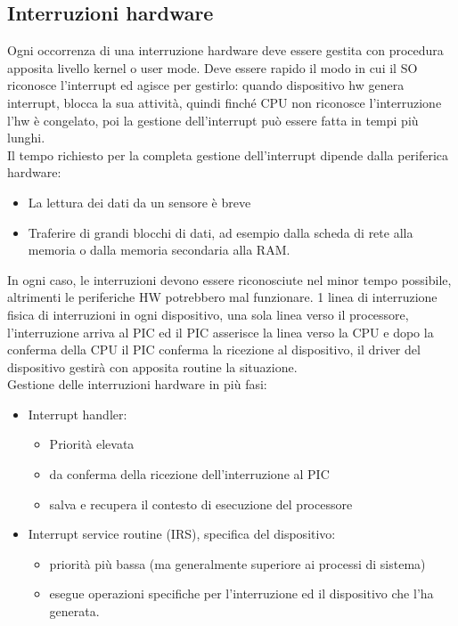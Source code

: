 \documentclass[12pt, oneside]{extbook}
\begin{document}
\subsection{Interruzioni hardware}
Ogni occorrenza di una interruzione hardware deve essere gestita con procedura apposita livello kernel o user mode. Deve essere rapido il modo in cui il SO riconosce l'interrupt ed agisce per gestirlo: quando dispositivo hw genera interrupt, blocca la sua attività, quindi finché CPU non riconosce l'interruzione l'hw è congelato, poi la gestione dell'interrupt può essere fatta in tempi più lunghi.\\ Il tempo richiesto per la completa gestione dell'interrupt dipende dalla periferica hardware:
\begin{itemize}
\item La lettura dei dati da un sensore è breve
\item Traferire di grandi blocchi di dati, ad esempio dalla scheda di rete alla memoria o dalla memoria secondaria alla RAM.
\end{itemize}
In ogni caso, le interruzioni devono essere riconosciute nel minor tempo possibile, altrimenti le periferiche HW potrebbero mal funzionare. 1 linea di interruzione fisica di interruzioni in ogni dispositivo, una sola linea verso il processore, l'interruzione arriva al PIC ed il PIC asserisce la linea verso la CPU e dopo la conferma della CPU il PIC conferma la ricezione al dispositivo, il driver del dispositivo gestirà con apposita routine la situazione.\\ Gestione delle interruzioni hardware in più fasi:
\begin{itemize}
\item Interrupt handler: 
\begin{itemize}
\item Priorità elevata
\item da conferma della ricezione dell'interruzione al PIC
\item salva e recupera il contesto di esecuzione del processore
\end{itemize}
\item Interrupt service routine (IRS), specifica del dispositivo:
\begin{itemize}
\item priorità più bassa (ma generalmente superiore ai processi di sistema)
\item esegue operazioni specifiche per l'interruzione ed il dispositivo che l'ha generata.
\end{itemize}
\end{itemize}
\end{document}
